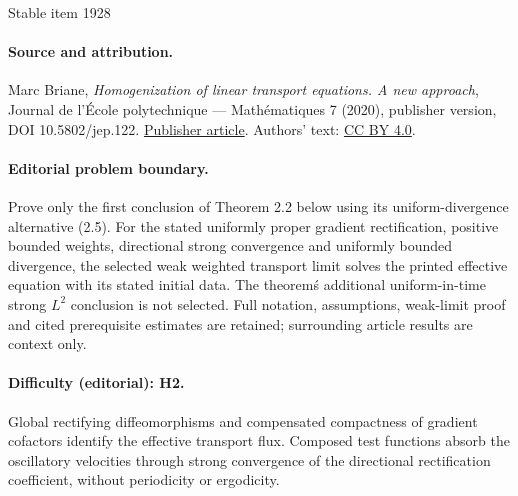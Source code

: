 \documentclass[11pt]{article}
\numberwithin{equation}{section}
\begin{document}
\begin{center}{\Large Stable item 1928}\end{center}
\paragraph{Source and attribution.}
Marc Briane, \emph{Homogenization of linear transport equations. A new approach}, Journal de l’École polytechnique — Mathématiques 7 (2020), publisher version, DOI 10.5802/jep.122. \href{https://jep.centre-mersenne.org/articles/10.5802/jep.122/}{Publisher article}. Authors' text: \href{https://creativecommons.org/licenses/by/4.0/}{CC BY 4.0}.
\paragraph{Editorial problem boundary.}
Prove only the first conclusion of Theorem 2.2 below using its uniform-divergence alternative (2.5). For the stated uniformly proper gradient rectification, positive bounded weights, directional strong convergence and uniformly bounded divergence, the selected weak weighted transport limit solves the printed effective equation with its stated initial data. The theorem\'s additional uniform-in-time strong \(L^2\) conclusion is not selected. Full notation, assumptions, weak-limit proof and cited prerequisite estimates are retained; surrounding article results are context only.
\paragraph{Difficulty (editorial): H2.}
Global rectifying diffeomorphisms and compensated compactness of gradient cofactors identify the effective transport flux. Composed test functions absorb the oscillatory velocities through strong convergence of the directional rectification coefficient, without periodicity or ergodicity.
\end{document}
